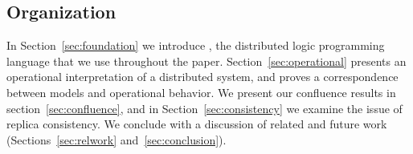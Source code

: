 \subsection{Organization}
In Section~\ref{sec:foundation} we introduce \lang, the distributed logic programming language that we use throughout the paper.  Section~\ref{sec:operational} presents an operational interpretation of a distributed system, and proves a correspondence between \lang models and operational behavior.  We present our confluence results in section~\ref{sec:confluence}, and in Section~\ref{sec:consistency} we examine the issue of replica consistency.  We conclude with a discussion of related and future work (Sections~\ref{sec:relwork} and~\ref{sec:conclusion}).
